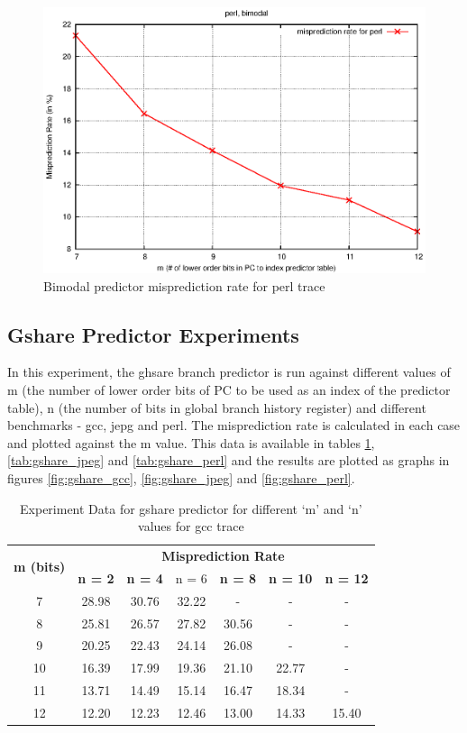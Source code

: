 \begin{figure} [htbp]
    \centering
    \includegraphics[scale=1.32] {image/perl_bimodal.eps}
    \caption{Bimodal predictor misprediction rate for perl trace}
    \label{fig:bimodal_perl}
\end{figure}

\subsection{Gshare Predictor Experiments}
In this experiment, the ghsare branch predictor is run against different values of m (the number of lower order bits of PC to be used as an index of the predictor table), n (the number of bits in global branch history register) and different benchmarks - gcc, jepg and perl. The misprediction rate is calculated in each case and plotted against the m value. This data is available in tables \ref{tab:gshare_gcc}, \ref{tab:gshare_jpeg} and \ref{tab:gshare_perl} and the results are plotted as graphs in figures \ref{fig:gshare_gcc}, \ref{fig:gshare_jpeg} and \ref{fig:gshare_perl}.

\begin{table}[htbp]
    \centering
    \begin{tabular}{|c|c|c|c|c|c|c|}
        \hline
        \multirow{2}[6]{*}{\bf m (bits) } & \multicolumn{6}{c|}{\bf Misprediction Rate} \\
        \cline{2-7} & \bf n = 2 & \bf n = 4 & n = 6 & \bf n = 8 & \bf n = 10 & \bf n = 12 \\
        \hline
         7 & 28.98 & 30.76 & 32.22 & - & - & - \\
         8 & 25.81 & 26.57 & 27.82 & 30.56 & - & - \\
         9 & 20.25 & 22.43 & 24.14 & 26.08 & - & - \\
        10 & 16.39 & 17.99 & 19.36 & 21.10 & 22.77 & - \\
        11 & 13.71 & 14.49 & 15.14 & 16.47 & 18.34 & - \\
        12 & 12.20 & 12.23 & 12.46 & 13.00 & 14.33 & 15.40 \\
        \hline
    \end{tabular}
    \captionsetup{justification=centering}
    \caption{Experiment Data for gshare predictor for different `m' and `n' values for gcc trace}
    \label{tab:gshare_gcc}
\end{table}

